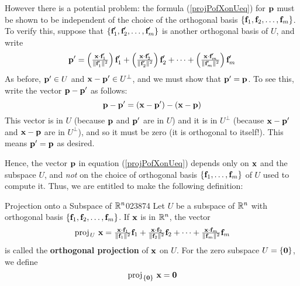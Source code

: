However there is a potential problem: the formula (\ref{projPofXonUeq}) for $\textbf{p}$ must be shown to be independent of the choice of the orthogonal basis $\{\textbf{f}_{1}, \textbf{f}_{2}, \dots, \textbf{f}_{m}\}$. To verify this, suppose that $\{\textbf{f}_1^\prime, \textbf{f}_2^\prime, \dots, \textbf{f}_m^\prime \}$  is another orthogonal basis of $U$, and write
\begin{equation*}
\textbf{p}^{\prime} = \left(\tfrac{\textbf{x} \cdot \textbf{f}^{\prime}_{1}}{\| \textbf{f}^{\prime}_{1} \|^2}\right)\textbf{f}^{\prime}_{1} + \left(\tfrac{\textbf{x} \cdot \textbf{f}^{\prime}_{2}}{\| \textbf{f}^{\prime}_{2} \|^2}\right)\textbf{f}^{\prime}_{2} + \dots +\left(\tfrac{\textbf{x} \cdot \textbf{f}^{\prime}_{m}}{\| \textbf{f}^{\prime}_{m} \|^2}\right)\textbf{f}^{\prime}_{m}
\end{equation*}
As before, $\textbf{p}^{\prime} \in U$ and $\textbf{x} - \textbf{p}^{\prime} \in U^\perp$, and we must show that $\textbf{p}^{\prime} = \textbf{p}$. To see this, write the vector $\textbf{p} - \textbf{p}^\prime$ as follows:
\begin{equation*}
\textbf{p} - \textbf{p}^{\prime} = (\textbf{x} - \textbf{p}^{\prime}) - (\textbf{x} - \textbf{p})
\end{equation*}
This vector is in $U$ (because $\textbf{p}$ and $\textbf{p}^\prime$ are in $U$) and it is in $U^\perp$ (because $\textbf{x} - \textbf{p}^\prime$ and $\textbf{x} - \textbf{p}$ are in $U^\perp$), and so it must be zero (it is orthogonal to itself!). This means $\textbf{p}^\prime = \textbf{p}$ as desired.

Hence, the vector $\textbf{p}$ in equation (\ref{projPofXonUeq}) depends only on $\textbf{x}$ and the subspace $U$, and \textit{not} on the choice of orthogonal basis $\{\textbf{f}_{1}, \dots, \textbf{f}_{m}\}$ of $U$ used to compute it. Thus, we are entitled to make the following definition:


\begin{definition}{Projection onto a Subspace of $\mathbb{R}^n$}{023874}
Let $U$ be a subspace of $\mathbb{R}^n$ with orthogonal basis $\{\textbf{f}_{1}, \textbf{f}_{2}, \dots, \textbf{f}_{m}\}$. If $\textbf{x}$ is in $\mathbb{R}^n$, the vector
\begin{equation*}
{\normalfont \thinspace\operatorname{proj\medspace}_{\!U}\,{\textbf{x}} =\tfrac{\textbf{x} \cdot\textbf{f}_{1}}{\|\textbf{f}_{1} \|^2}\textbf{f}_{1} + \tfrac{\textbf{x} \cdot\textbf{f}_{2}}{\|\textbf{f}_{2} \|^2}\textbf{f}_{2}+ \dots +\tfrac{\textbf{x} \cdot\textbf{f}_{m}}{\|\textbf{f}_{m} \|^2}\textbf{f}_{m}}
\end{equation*}
is called the \textbf{orthogonal projection} of $\textbf{x}$ on $U$. For the zero subspace $U = \{\textbf{0}\}$, we define
\begin{equation*}
{\normalfont \thinspace\operatorname{proj\medspace}_{\!\{\textbf{0}\}}\,{\textbf{x}} = \textbf{0}}
\end{equation*}
\end{definition}

